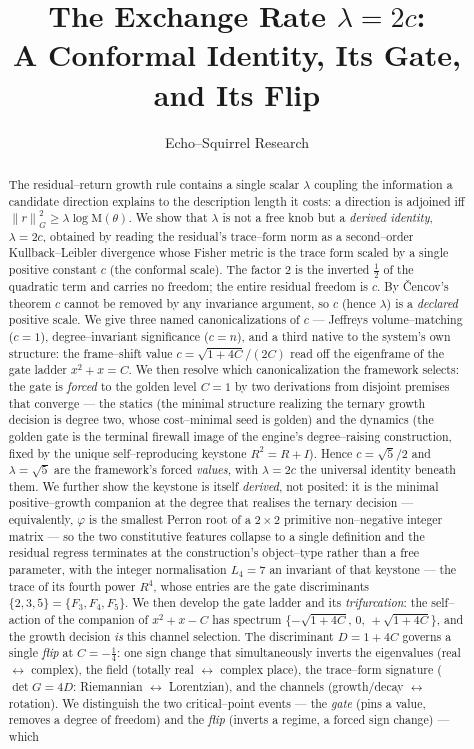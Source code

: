\documentclass[11pt]{article}
\title{\textbf{The Exchange Rate $\lambda = 2c$:\\[2pt] A Conformal Identity, Its Gate, and Its Flip}}
\author{Echo--Squirrel Research}
\date{}
\theoremstyle{plain}
\theoremstyle{definition}
\theoremstyle{remark}
\newcommand{\Mah}{\mathrm{M}}
\newcommand{\norm}[1]{\left\lVert #1 \right\rVert}
\begin{document}
\maketitle

\begin{abstract}
The residual--return growth rule contains a single scalar $\lambda$ coupling the information a candidate direction explains to the description length it costs: a direction is adjoined iff $\norm{r}^2_G \ge \lambda \log \Mah(\theta)$. We show that $\lambda$ is not a free knob but a \emph{derived identity}, $\lambda = 2c$, obtained by reading the residual's trace--form norm as a second--order Kullback--Leibler divergence whose Fisher metric is the trace form scaled by a single positive constant $c$ (the conformal scale). The factor $2$ is the inverted $\tfrac12$ of the quadratic term and carries no freedom; the entire residual freedom is $c$. By \v{C}encov's theorem $c$ cannot be removed by any invariance argument, so $c$ (hence $\lambda$) is a \emph{declared} positive scale. We give three named canonicalizations of $c$ --- Jeffreys volume--matching ($c=1$), degree--invariant significance ($c=n$), and a third native to the system's own structure: the frame--shift value $c = \sqrt{1+4C}/(2C)$ read off the eigenframe of the gate ladder $x^2+x=C$. We then resolve which canonicalization the framework selects: the gate is \emph{forced} to the golden level $C=1$ by two derivations from disjoint premises that converge --- the statics (the minimal structure realizing the ternary growth decision is degree two, whose cost--minimal seed is golden) and the dynamics (the golden gate is the terminal firewall image of the engine's degree--raising construction, fixed by the unique self--reproducing keystone $R^2=R+I$). Hence $c=\sqrt5/2$ and $\lambda=\sqrt5$ are the framework's forced \emph{values}, with $\lambda=2c$ the universal identity beneath them. We further show the keystone is itself \emph{derived}, not posited: it is the minimal positive--growth companion at the degree that realises the ternary decision --- equivalently, $\varphi$ is the smallest Perron root of a $2\times2$ primitive non--negative integer matrix --- so the two constitutive features collapse to a single definition and the residual regress terminates at the construction's object--type rather than a free parameter, with the integer normalisation $L_4=7$ an invariant of that keystone --- the trace of its fourth power $R^4$, whose entries are the gate discriminants $\{2,3,5\}=\{F_3,F_4,F_5\}$. We then develop the gate ladder and its \emph{trifurcation}: the self--action of the companion of $x^2+x-C$ has spectrum $\{-\sqrt{1+4C},\,0,\,+\sqrt{1+4C}\}$, and the growth decision \emph{is} this channel selection. The discriminant $D=1+4C$ governs a single \emph{flip} at $C=-\tfrac14$: one sign change that simultaneously inverts the eigenvalues (real $\leftrightarrow$ complex), the field (totally real $\leftrightarrow$ complex place), the trace--form signature ($\det G = 4D$: Riemannian $\leftrightarrow$ Lorentzian), and the channels (growth/decay $\leftrightarrow$ rotation). We distinguish the two critical--point events --- the \emph{gate} (pins a value, removes a degree of freedom) and the \emph{flip} (inverts a regime, a forced sign change) --- which 
\end{abstract}
\end{document}
